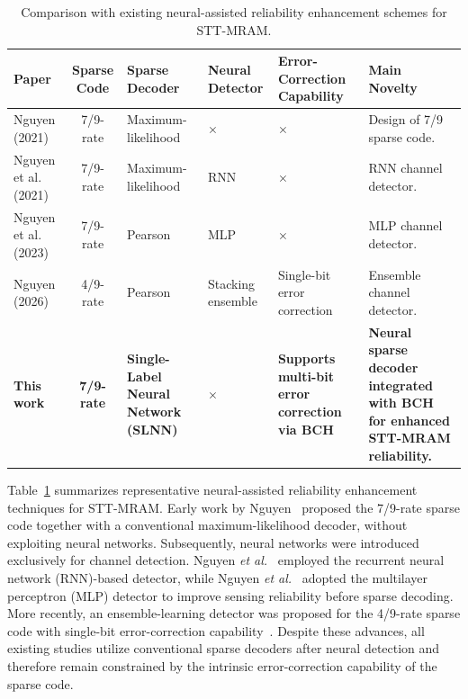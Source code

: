 \documentclass[conference]{IEEEtran}
\begin{document}
\begin{table}[!t]
\centering
\caption{Comparison with existing neural-assisted reliability enhancement schemes for STT-MRAM.}
\label{tab:comparison}

\footnotesize
\setlength{\tabcolsep}{3pt}
\renewcommand{\arraystretch}{1.15}

\begin{tabular}{|l|c|p{2.2cm}|p{2.5cm}|p{2.0cm}|p{4.5cm}|}
\hline
\textbf{Paper} &
\textbf{Sparse Code} &
{\textbf{Sparse Decoder}} &
{\textbf{Neural Detector}} &
{\textbf{Error-Correction Capability}} &
{\textbf{Main Novelty}} \\
\hline \hline

Nguyen (2021) \cite{nguyen2021design} &
7/9-rate &
Maximum-likelihood &
$\times$ &
$\times$ &
Design of 7/9 sparse code. \\ \hline

Nguyen et al. (2021) \cite{nguyen2021performance} &
7/9-rate &
Maximum-likelihood &
RNN &
$\times$ &
RNN channel detector. \\ \hline

Nguyen et al. (2023) \cite{nguyen2023neural}&
7/9-rate &
Pearson &
MLP &
$\times$ &
MLP channel detector. \\ \hline

Nguyen (2026) \cite{nguyen2025stacking}&
4/9-rate &
Pearson &
Stacking ensemble &
Single-bit error correction &
Ensemble channel detector. \\ \hline

\textbf{This work} &
\textbf{7/9-rate} &
\textbf{Single-Label Neural Network (SLNN)} &
\textbf{$\times$} &
\textbf{Supports multi-bit error correction via BCH} &
\textbf{Neural sparse decoder integrated with BCH for enhanced STT-MRAM reliability.} \\

\hline 
\end{tabular}
\end{table}





Table~\ref{tab:comparison} summarizes representative neural-assisted reliability enhancement techniques for STT-MRAM. Early work by Nguyen~\cite{nguyen2021design} proposed the 7/9-rate sparse code together with a conventional maximum-likelihood decoder, without exploiting neural networks. Subsequently, neural networks were introduced exclusively for channel detection. Nguyen \textit{et al.}~\cite{nguyen2021performance} employed the recurrent neural network (RNN)-based detector, while Nguyen \textit{et al.}~\cite{nguyen2023neural} adopted the multilayer perceptron (MLP) detector to improve sensing reliability before sparse decoding. More recently, an ensemble-learning detector was proposed for the 4/9-rate sparse code with single-bit error-correction capability~\cite{nguyen2025stacking}. Despite these advances, all existing studies utilize conventional sparse decoders after neural detection and therefore remain constrained by the intrinsic error-correction capability of the sparse code.
\end{document}
